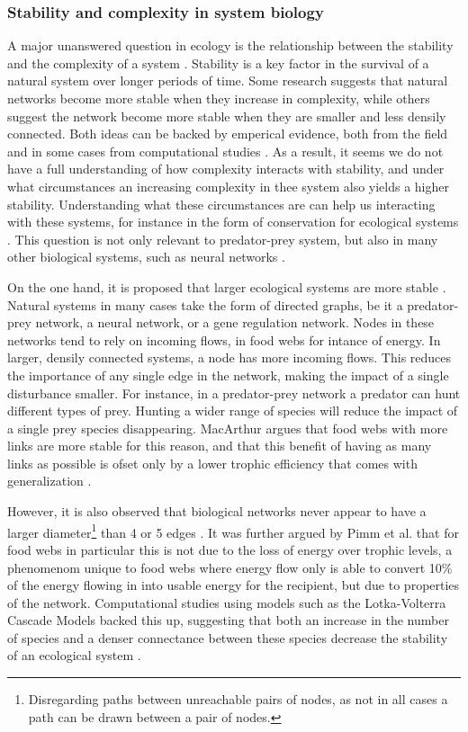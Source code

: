 \documentclass[../main.tex]{subfiles}
\begin{document}
\subsubsection{Stability and complexity in system biology}

A major unanswered question in ecology is the relationship between the stability and the complexity of a system \cite{macarthur1955fluctuations, pimm1977number, kondoh2003foraging}.
Stability is a key factor in the survival of a natural system over longer periods of time.
Some research suggests that natural networks become more stable when they increase in complexity, while others suggest the network become more stable when they are smaller and less densily connected.
Both ideas can be backed by emperical evidence, both from the field and in some cases from computational studies \cite{chen2001global, kondoh2003foraging}.
As a result, it seems we do not have a full understanding of how complexity interacts with stability, and under what circumstances an increasing complexity in thee system also yields a higher stability.
Understanding what these circumstances are can help us interacting with these systems, for instance in the form of conservation for ecological systems \cite{kondoh2003foraging}.
This question is not only relevant to predator-prey system, but also in many other biological systems, such as neural networks \cite{tononi1999measures}.

On the one hand, it is proposed that larger ecological systems are more stable \cite{macarthur1955fluctuations}.
Natural systems in many cases take the form of directed graphs, be it a predator-prey network, a neural network, or a gene regulation network.
Nodes in these networks tend to rely on incoming flows, in food webs for intance of energy.
In larger, densily connected systems, a node has more incoming flows.
This reduces the importance of any single edge in the network, making the impact of a single disturbance smaller.
For instance, in a predator-prey network a predator can hunt different types of prey.
Hunting a wider range of species will reduce the impact of a single prey species disappearing.
MacArthur argues that food webs with more links are more stable for this reason, and that this benefit of having as many links as possible is ofset only by a lower trophic efficiency that comes with generalization \cite{macarthur1955fluctuations}.

However, it is also observed that biological networks never appear to have a larger diameter\footnote{Disregarding paths between unreachable pairs of nodes, as not in all cases a path can be drawn between a pair of nodes.} than 4 or 5 edges \cite{pimm1977number}.
It was further argued by Pimm et al. that for food webs in particular this is not due to the loss of energy over trophic levels, a phenomenom unique to food webs where energy flow only is able to convert 10\% of the energy flowing in into usable energy for the recipient, but due to properties of the network.
Computational studies using models such as the Lotka-Volterra Cascade Models backed this up, suggesting that both an increase in the number of species and a denser connectance between these species decrease the stability of an ecological system \cite{chen2001global}.
\end{document}
